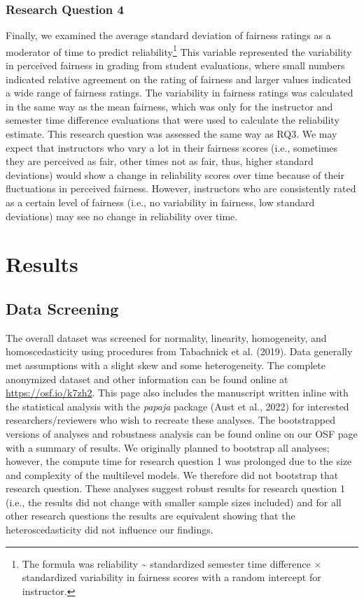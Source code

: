 \documentclass[
  man]{apa7}
\begin{document}
\hypertarget{research-question-4}{%
\subsubsection{Research Question 4}\label{research-question-4}}

Finally, we examined the average standard deviation of fairness ratings
as a moderator of time to predict reliability\footnote{The formula was
  reliability \textasciitilde{} standardized semester time difference \(\times\) standardized
  variability in fairness scores with a random intercept for instructor.}
This variable represented the variability in perceived fairness in
grading from student evaluations, where small numbers indicated relative
agreement on the rating of fairness and larger values indicated a wide
range of fairness ratings. The variability in fairness ratings was
calculated in the same way as the mean fairness, which was only for the
instructor and semester time difference evaluations that were used to
calculate the reliability estimate. This research question was assessed the same way as RQ3. We may expect that instructors who vary a lot in their fairness scores (i.e., sometimes they are perceived as fair, other times not as fair, thus, higher standard deviations) would show a change in reliability scores over time because of their fluctuations in perceived fairness. However, instructors who are consistently rated as a certain level of fairness (i.e., no variability in fairness, low standard deviations) may see no change in reliability over time.

\hypertarget{results}{%
\section{Results}\label{results}}

\hypertarget{data-screening}{%
\subsection{Data Screening}\label{data-screening}}

The overall dataset was screened for normality, linearity, homogeneity,
and homoscedasticity using procedures from Tabachnick et al. (2019). Data
generally met assumptions with a slight skew and some heterogeneity. The
complete anonymized dataset and other information can be found online at
\url{https://osf.io/k7zh2}. This page also includes the manuscript written
inline with the statistical analysis with the \emph{papaja} package
(Aust et al., 2022) for interested researchers/reviewers who wish to recreate
these analyses. The bootstrapped versions of analyses and robustness
analysis can be found online on our OSF page with a summary of results.
We originally planned to bootstrap all analyses; however, the compute
time for research question 1 was prolonged due to the size and
complexity of the multilevel models. We therefore did not bootstrap that
research question. These analyses suggest robust results for research
question 1 (i.e., the results did not change with smaller sample sizes
included) and for all other research questions the results are
equivalent showing that the heteroscedasticity did not influence our
findings.
\end{document}
